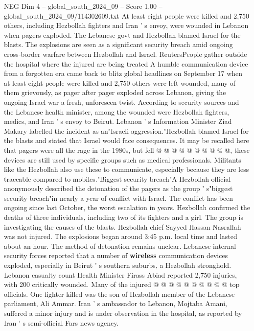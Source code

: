 \begin{textsample}{NEG Dim 4 – global\_south\_2024\_09 – Score 1.00 – global\_south\_2024\_09/114302609.txt}  \label{ex:f4_neg_168}
At least eight people were killed and 2,750 others, including Hezbollah fighters and Iran ' s envoy, were wounded in Lebanon when pagers exploded.
The Lebanese govt and Hezbollah blamed Israel for the blasts.
The explosions are seen as a significant security breach amid ongoing cross-border warfare between Hezbollah and Israel.
ReutersPeople gather outside the hospital where the injured are being treated A humble communication device from a forgotten era came back to blitz global headlines on September 17 when at least eight people were killed and 2,750 others were left wounded, many of them grievously, as pager after pager exploded across Lebanon, giving the ongoing Israel war a fresh, unforeseen twist.
According to security sources and the Lebanese health minister, among the wounded were Hezbollah fighters, medics, and Iran ' s envoy to Beirut.
Lebanon ' s Information Minister Ziad Makary labelled the incident as an"Israeli aggression."Hezbollah blamed Israel for the blasts and stated that Israel would face consequences.
It may be recalled here that pagers were all the rage in the 1980s, but fell @ @ @ @ @ @ @ @ @ @, these devices are still used by specific groups such as medical professionals.
Militants like the Hezbollah also use these to communicate, especially because they are less traceable compared to mobiles."Biggest security breach"A Hezbollah official anonymously described the detonation of the pagers as the group ' s"biggest security breach"in nearly a year of conflict with Israel.
The conflict has been ongoing since last October, the worst escalation in years.
Hezbollah confirmed the deaths of three individuals, including two of its fighters and a girl.
The group is investigating the causes of the blasts.
Hezbollah chief Sayyed Hassan Nasrallah was not injured.
The explosions began around 3:45 p.m. local time and lasted about an hour.
The method of detonation remains unclear.
Lebanese internal security forces reported that a number of \textbf{wireless} communication devices exploded, especially in Beirut ' s southern suburbs, a Hezbollah stronghold.
Lebanon casualty count Health Minister Firass Abiad reported 2,750 injuries, with 200 critically wounded.
Many of the injured @ @ @ @ @ @ @ @ @ @ top officials.
One fighter killed was the son of Hezbollah member of the Lebanese parliament, Ali Ammar.
Iran ' s ambassador to Lebanon, Mojtaba Amani, suffered a minor injury and is under observation in the hospital, as reported by Iran ' s semi-official Fars news agency.

\end{textsample}
